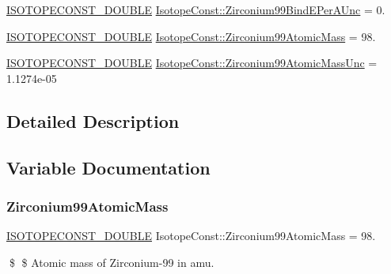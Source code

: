\begin{DoxyCompactItemize}
\mbox{\hyperlink{group___isotope_const-_macros_ga8f45a7272ce02c0b4c65c44636ed719a}{I\+S\+O\+T\+O\+P\+E\+C\+O\+N\+S\+T\+\_\+\+D\+O\+U\+B\+LE}} \mbox{\hyperlink{group___isotope_const-_zirconium-_zr99_ga29c1da8811976dbae7062800fc19556a}{Isotope\+Const\+::\+Zirconium99\+Bind\+E\+Per\+A\+Unc}} = 0.
\item 
\mbox{\hyperlink{group___isotope_const-_macros_ga8f45a7272ce02c0b4c65c44636ed719a}{I\+S\+O\+T\+O\+P\+E\+C\+O\+N\+S\+T\+\_\+\+D\+O\+U\+B\+LE}} \mbox{\hyperlink{group___isotope_const-_zirconium-_zr99_gab448bf31138095e23f5877c67b7816ae}{Isotope\+Const\+::\+Zirconium99\+Atomic\+Mass}} = 98.
\item 
\mbox{\hyperlink{group___isotope_const-_macros_ga8f45a7272ce02c0b4c65c44636ed719a}{I\+S\+O\+T\+O\+P\+E\+C\+O\+N\+S\+T\+\_\+\+D\+O\+U\+B\+LE}} \mbox{\hyperlink{group___isotope_const-_zirconium-_zr99_ga7646e92714e2f60d1a919a78cd6144ef}{Isotope\+Const\+::\+Zirconium99\+Atomic\+Mass\+Unc}} = 1.\+1274e-\/05
\end{DoxyCompactItemize}


\subsection{Detailed Description}


\subsection{Variable Documentation}
\mbox{\label{group___isotope_const-_zirconium-_zr99_gab448bf31138095e23f5877c67b7816ae}} 
\subsubsection{\texorpdfstring{Zirconium99\+Atomic\+Mass}{Zirconium99AtomicMass}}
{\footnotesize\ttfamily \mbox{\hyperlink{group___isotope_const-_macros_ga8f45a7272ce02c0b4c65c44636ed719a}{I\+S\+O\+T\+O\+P\+E\+C\+O\+N\+S\+T\+\_\+\+D\+O\+U\+B\+LE}} Isotope\+Const\+::\+Zirconium99\+Atomic\+Mass = 98.}

\$ \$ Atomic mass of Zirconium-\/99 in amu. \mbox{\label{group___isotope_const-_zirconium-_zr99_ga7646e92714e2f60d1a919a78cd6144ef}} 
